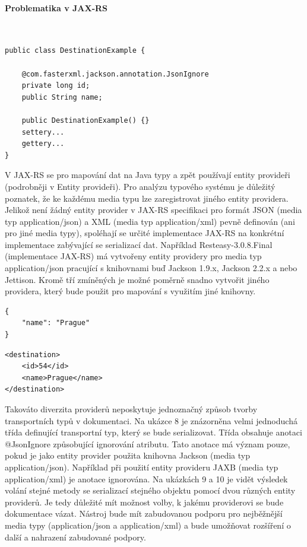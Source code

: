\documentclass[11pt,twoside,a4paper]{book}
\begin{document}
\paragraph{Problematika v JAX-RS}
\mbox{}\\

\begin{lstlisting}[frame=single]
public class DestinationExample {

    @com.fasterxml.jackson.annotation.JsonIgnore
    private long id;
    public String name;

    public DestinationExample() {}
    settery...
    gettery...
}
\end{lstlisting}

V JAX-RS se pro mapování dat na Java typy a zpět používají entity provideři (podrobněji v
Entity provideři). Pro analýzu typového systému je důležitý poznatek, že ke každému media
typu lze zaregistrovat jiného entity providera. Jelikož není žádný entity provider v JAX-RS
specifikaci pro formát JSON (media typ application/json) a XML (media typ
application/xml) pevně definován (ani pro jiné media typy), spoléhají se určité
implementace JAX-RS na konkrétní implementace zabývající se serializací dat. Například
Resteasy-3.0.8.Final (implementace JAX-RS) má vytvořeny entity providery pro media typ
application/json pracující s knihovnami buď Jackson 1.9.x, Jackson 2.2.x a nebo
Jettison. Kromě tří zmíněných je možné poměrně snadno vytvořit jiného providera, který
bude použit pro mapování s využitím jiné knihovny. 

\begin{lstlisting}[frame=single]
{
    "name": "Prague"
}
\end{lstlisting}

\begin{lstlisting}[frame=single]
<destination>
    <id>54</id>
    <name>Prague</name>
</destination>
\end{lstlisting}

Takováto diverzita providerů neposkytuje
jednoznačný způsob tvorby transportních typů v dokumentaci. Na ukázce 8 je znázorněna
velmi jednoduchá třída definující transportní typ, který se bude serializovat. Třída obsahuje
anotaci @JsonIgnore způsobující ignorování atributu. Tato anotace má význam pouze,
pokud je jako entity provider použita knihovna Jackson (media typ application/json).
Například při použití entity provideru JAXB (media typ application/xml) je anotace
ignorována. Na ukázkách 9 a 10 je vidět výsledek volání stejné metody se serializací stejného
objektu pomocí dvou různých entity providerů. Je tedy důležité mít možnost volby, k jakému
providerovi se bude dokumentace vázat. Nástroj bude mít zabudovanou podporu pro
nejběžnější media typy (application/json a application/xml) a bude umožňovat
rozšíření o další a nahrazení zabudované podpory.
\end{document}
